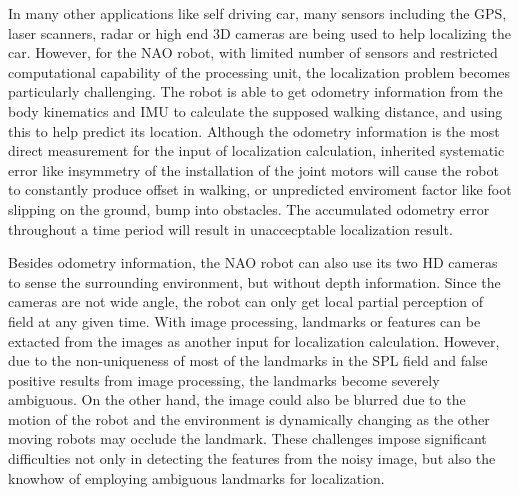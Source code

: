 
In many other applications like self driving car, many sensors including the GPS, laser scanners, radar or high end 3D cameras are being used to help localizing the car. 
However, for the NAO robot, with limited number of sensors and restricted computational capability of the processing unit, the localization problem becomes particularly challenging. The robot is able to get odometry information from the body kinematics and \gls{IMU} to calculate the supposed walking distance, and using this to help predict its location. 
Although the odometry information is the most direct measurement for the input of localization calculation, inherited systematic error like insymmetry of the installation of the joint motors will cause the robot to constantly produce offset in walking, or unpredicted enviroment factor like foot slipping on the ground, bump into obstacles. 
The accumulated odometry error throughout a time period will result in unaccecptable localization result. 

Besides odometry information, the NAO robot can also use its two \gls{HD} cameras to sense the surrounding environment, but without depth information. Since the cameras are not wide angle, the robot can only get local partial perception of field at any given time.
With image processing, landmarks or features can be extacted from the images as another input for localization calculation. However, due to the non-uniqueness of most of the landmarks in the \gls{SPL} field and false positive results from image processing, the landmarks become severely ambiguous. On the other hand, the image could also be blurred due to the motion of the robot and the environment is dynamically changing as the other moving robots may occlude the landmark. These challenges impose significant difficulties not only in detecting the features from the noisy image, but also the knowhow of employing ambiguous landmarks for localization. 


